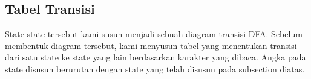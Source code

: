 \subsection{Tabel Transisi}
State-state tersebut kami susun menjadi sebuah diagram transisi DFA. Sebelum membentuk diagram tersebut, kami menyusun tabel yang menentukan transisi dari satu state ke state yang lain berdasarkan karakter yang dibaca. Angka pada state disusun berurutan dengan state yang telah disusun pada subsection diatas.

\begin{table}[H]
    \centering
\end{table}
